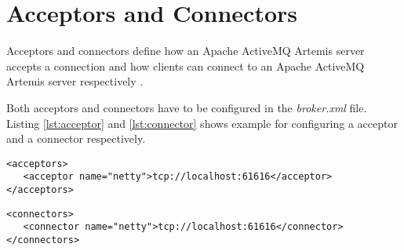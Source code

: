 \section{Acceptors and Connectors}

Acceptors and connectors define how an Apache ActiveMQ Artemis server accepts a connection and how clients can connect to an Apache ActiveMQ Artemis server respectively \parencite{artemis_transports}.

Both acceptors and connectors have to be configured in the \textit{broker.xml} file. Listing \ref{lst:acceptor} and \ref{lst:connector} shows example for configuring a acceptor and a connector respectively.

\bigskip
\begin{lstlisting}[style=XmlInputStyle,caption=Configuring Acceptor Example, label={lst:acceptor}]
<acceptors>
   <acceptor name="netty">tcp://localhost:61616</acceptor>
</acceptors>
\end{lstlisting}

\bigskip
\begin{lstlisting}[style=XmlInputStyle,caption=Configuring Connector Example, label={lst:connector}]
<connectors>
   <connector name="netty">tcp://localhost:61616</connector>
</connectors>
\end{lstlisting}

